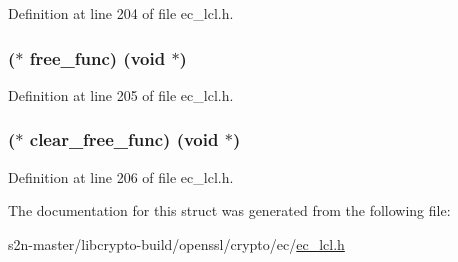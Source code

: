 Definition at line 204 of file ec\+\_\+lcl.\+h.

\subsubsection[{\texorpdfstring{free\+\_\+func}{free_func}}]{($\ast$ free\+\_\+func) ({\bf void} $\ast$)}\hypertarget{structec__extra__data__st_aa8cedfd81f841b27885884598e1fafcf}{}\label{structec__extra__data__st_aa8cedfd81f841b27885884598e1fafcf}


Definition at line 205 of file ec\+\_\+lcl.\+h.

\subsubsection[{\texorpdfstring{clear\+\_\+free\+\_\+func}{clear_free_func}}]{($\ast$ clear\+\_\+free\+\_\+func) ({\bf void} $\ast$)}\hypertarget{structec__extra__data__st_a08a1758f172b86592ffeee32b5faf83a}{}\label{structec__extra__data__st_a08a1758f172b86592ffeee32b5faf83a}


Definition at line 206 of file ec\+\_\+lcl.\+h.



The documentation for this struct was generated from the following file\+:\begin{DoxyCompactItemize}
\item 
s2n-\/master/libcrypto-\/build/openssl/crypto/ec/\hyperlink{ec__lcl_8h}{ec\+\_\+lcl.\+h}\end{DoxyCompactItemize}
